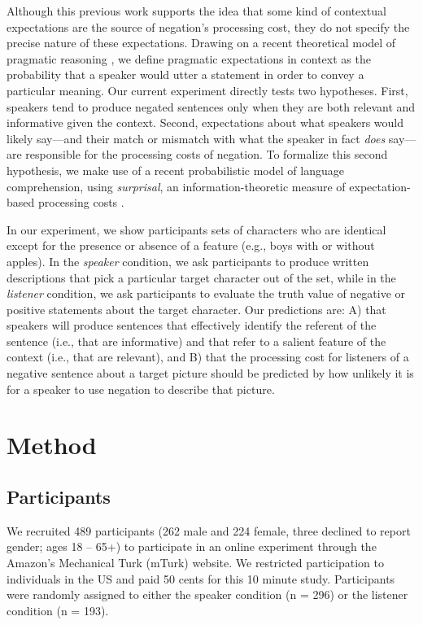 \documentclass[man, noapacite]{apa2}
\begin{document}
Although this previous work supports the idea that some kind of contextual expectations are the source of negation's processing cost, they do not specify the precise nature of these expectations. Drawing on a recent theoretical model of pragmatic reasoning \cite{frank2012}, we define pragmatic expectations in context as the probability that a speaker would utter a statement in order to convey a particular meaning. Our current experiment directly tests two hypotheses.  First, speakers tend to produce negated sentences only when they are both relevant and informative given the context.  Second, expectations about what speakers would likely say---and their match or mismatch with what the speaker in fact \emph{does} say---are responsible for the processing costs of negation. To formalize this second hypothesis, we make use of a recent probabilistic model of language comprehension, using \emph{surprisal}, an information-theoretic measure of expectation-based processing costs \cite{levy2008}.

In our experiment, we show participants sets of characters who are identical except for the presence or absence of a feature (e.g., boys with or without apples). In the \emph{speaker} condition, we ask participants to produce written descriptions that pick a particular target character out of the set, while in the \emph{listener} condition, we ask participants to evaluate the truth value of negative or positive statements about the target character. Our predictions are: A) that speakers will produce sentences that effectively identify the referent of the sentence (i.e., that are informative) and that refer to a salient feature of the context (i.e., that are relevant), and B) that the processing cost for listeners of a negative sentence about a target picture should be predicted by how unlikely it is for a speaker to use negation to describe that picture.

\section{Method}

\subsection{Participants} 

We recruited 489 participants (262 male and 224 female, three declined to report gender; ages 18 -- 65+) to participate in an online experiment through the Amazon's Mechanical Turk (mTurk) website.  We restricted participation to individuals in the US and paid 50 cents for this 10 minute study.  Participants were randomly assigned to either the speaker condition (n = 296) or the listener condition (n = 193).
\end{document}
